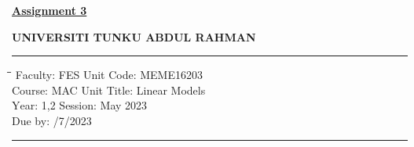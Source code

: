 \documentclass[soln,12pt]{utarexam}
\begin{document}
 \underline{\textbf{Assignment 3}}\\
 \centerline{\textbf{UNIVERSITI TUNKU ABDUL RAHMAN}}
 
 \medskip
 
 \hrule
 
 \begin{tabbing}
 \hspace{2.8cm}\=\hspace{5cm}\=\hspace{2.8cm}\=\kill
   \textsc Faculty:    \> \textsc FES \>
   \textsc Unit Code:  \> \textsc MEME16203\\
   \textsc Course:     \> \textsc MAC \>
   \textsc Unit Title: \> \textsc Linear Models\\
   \textsc Year:       \> \textsc 1,2 \>
   \textsc Session:    \> May 2023\\
   \textsc Due by:     /7/2023
   \end{tabbing}
 \hrule
 
 
 
\end{document}
